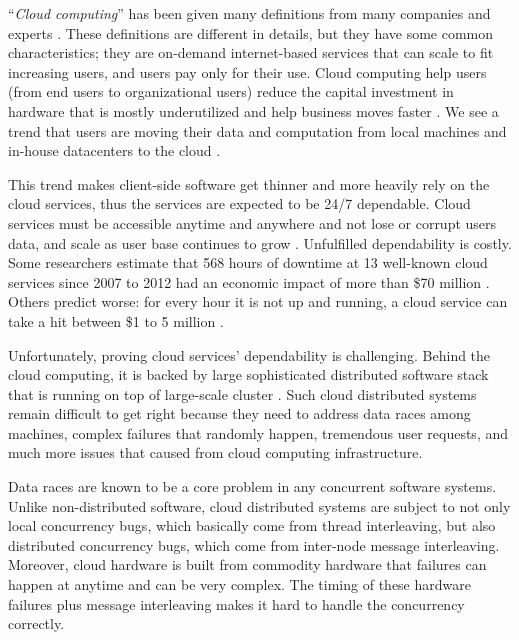 ``\textit{Cloud computing}'' has been given many definitions from many companies
and experts \cite{TwentyoneCloudDef, IBMCloudDef, PCMagCloudDef,
Foster+08-CloudAndGrid}. These definitions are different in details, but they
have some common characteristics; they are on-demand internet-based services
that can scale to fit increasing users, and users pay only for their use.
%
Cloud computing help users (from end users to organizational users) reduce the
capital investment in hardware that is mostly underutilized
\cite{Hayes+08-CloudComputing} and help business moves faster
\cite{Marston+11-CloudBusiness}. We see a trend that users are moving their data
and computation from local machines and in-house datacenters to the cloud
\cite{AdobeCloudStat, AWSCustomer, GmailStat, GoogleDriveStat, DropboxStat,
AstroInCloud, FacebookStat, Luo+16-BigDataBioResearch}.

This trend makes client-side software get thinner and more heavily rely on the
cloud services, thus the services are expected to be 24/7 dependable. Cloud
services must be accessible anytime and anywhere and not lose or corrupt users
data, and scale as user base continues to grow \cite{Buyya+09-Cloud5thUtil}.
%
Unfulfilled dependability is costly. Some researchers estimate that 568 hours of
downtime at 13 well-known cloud services since 2007 to 2012 had an economic
impact of more than \$70 million \cite{Essers12-70Million}. Others predict
worse: for every hour it is not up and running, a cloud service can take a hit
between \$1 to 5 million \cite{Linthicum13-InfoworldCostOutages}.

Unfortunately, proving cloud services' dependability is challenging. Behind the
cloud computing, it is backed by large sophisticated distributed software stack
\cite{Burrows06-Chubby, Chang+06-BigTable, Chapin+95-Hive, Corbett+12-Spanner,
DeanGhemawat04-MapReduce, DeCandia+07-Dynamo, Ghemawat+03-GoogleFS,
Hunt+10-ZooKeeperPaper, Lakshman+09-Cassandra, Melnik+10-DremelInteractive,
Zaharia+12-RDD} that is running on top of large-scale cluster .
Such cloud distributed systems remain difficult to get right because they need
to address data races among machines, complex failures that randomly happen,
tremendous user requests, and much more issues that caused from cloud computing
infrastructure.

Data races are known to be a core problem in any concurrent software systems.
Unlike non-distributed software, cloud distributed systems are subject to not
only local concurrency bugs, which basically come from thread interleaving, but
also distributed concurrency bugs, which come from inter-node message
interleaving.  Moreover, cloud hardware is built from commodity hardware that
failures can happen at anytime and can be very complex. The timing of these
hardware failures plus message interleaving makes it hard to handle the
concurrency correctly.


